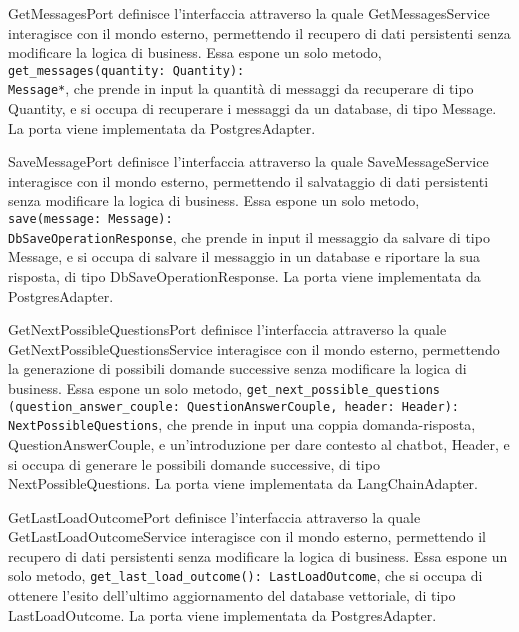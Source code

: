\label{sec:get_messages_port}
GetMessagesPort definisce l'interfaccia attraverso la quale GetMessagesService interagisce con il mondo esterno, permettendo il recupero di dati persistenti senza modificare la logica di business. Essa espone un solo metodo, \texttt{get\_messages(quantity: Quantity):\\ Message*}, che prende in input la quantità di messaggi da recuperare di tipo Quantity, e si occupa di recuperare i messaggi da un database, di tipo Message. La porta viene implementata da PostgresAdapter.

\label{sec:save_message_port}
SaveMessagePort definisce l'interfaccia attraverso la quale SaveMessageService interagisce con il mondo esterno, permettendo il salvataggio di dati persistenti senza modificare la logica di business. Essa espone un solo metodo, \texttt{save(message: Message):\\ DbSaveOperationResponse}, che prende in input il messaggio da salvare di tipo Message, e si occupa di salvare il messaggio in un database e riportare la sua risposta, di tipo DbSaveOperationResponse. La porta viene implementata da PostgresAdapter.

\label{sec:get_next_possible_questions_port}
GetNextPossibleQuestionsPort definisce l'interfaccia attraverso la quale GetNextPossibleQuestionsService interagisce con il mondo esterno, permettendo la generazione di possibili domande successive senza modificare la logica di business. Essa espone un solo metodo, \texttt{get\_next\_possible\_questions\\(question\_answer\_couple: QuestionAnswerCouple, header: Header):\\ NextPossibleQuestions}, che prende in input una coppia domanda-risposta, QuestionAnswerCouple, e un'introduzione per dare contesto al chatbot, Header, e si occupa di generare le possibili domande successive, di tipo NextPossibleQuestions. La porta viene implementata da LangChainAdapter.

\label{sec:get_last_load_outcome_port}
GetLastLoadOutcomePort definisce l'interfaccia attraverso la quale GetLastLoadOutcomeService interagisce con il mondo esterno, permettendo il recupero di dati persistenti senza modificare la logica di business. Essa espone un solo metodo, \texttt{get\_last\_load\_outcome(): LastLoadOutcome}, che si occupa di ottenere l'esito dell'ultimo aggiornamento del database vettoriale, di tipo LastLoadOutcome. La porta viene implementata da PostgresAdapter.

